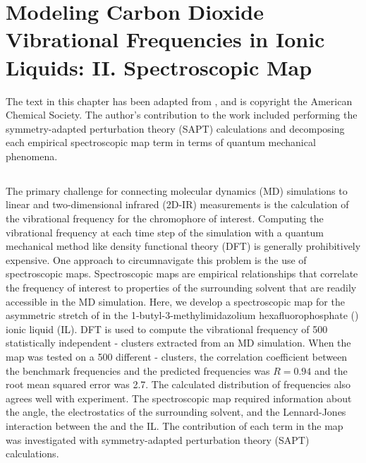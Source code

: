 \documentclass[%
  class = book,%
  crop = false,%
  float = true,%
  multi = true,%
  preview = false,%
]{standalone}
\begin{document}
\chapter[\texorpdfstring{\ce{CO2}}{CO2}-IL Spectroscopic Map Development]{Modeling Carbon Dioxide Vibrational Frequencies in Ionic Liquids: II. Spectroscopic Map}
\label{ch:paper_03}

The text in this chapter has been adapted from , and is copyright the American Chemical Society. The author's contribution to the work included performing the symmetry-adapted perturbation theory (SAPT) calculations and decomposing each empirical spectroscopic map term in terms of quantum mechanical phenomena.

\section{\texorpdfstring{}{Summary}}

The primary challenge for connecting molecular dynamics (MD) simulations to linear and two-dimensional infrared (2D-IR) measurements is the calculation of the vibrational frequency for the chromophore of interest. Computing the vibrational frequency at each time step of the simulation with a quantum mechanical method like density functional theory (DFT) is generally prohibitively expensive. One approach to circumnavigate this problem is the use of spectroscopic maps. Spectroscopic maps are empirical relationships that correlate the frequency of interest to properties of the surrounding solvent that are readily accessible in the MD simulation. Here, we develop a spectroscopic map for the asymmetric stretch of  in the 1-butyl-3-methylimidazolium hexafluorophosphate (\ce{[C4C1im][PF6]}) ionic liquid (IL). DFT is used to compute the vibrational frequency of \num{500} statistically independent -\ce{[C4C1im][PF6]} clusters extracted from an MD simulation. When the map was tested on a \num{500} different -\ce{[C4C1im][PF6]} clusters, the correlation coefficient between the benchmark frequencies and the predicted frequencies was \(R = 0.94\) and the root mean squared error was \SI{2.7}{\wavenumber}. The calculated distribution of frequencies also agrees well with experiment. The spectroscopic map required information about the  angle, the electrostatics of the surrounding solvent, and the Lennard-Jones interaction between the  and the IL. The contribution of each term in the map was investigated with symmetry-adapted perturbation theory (SAPT) calculations.
\end{document}
